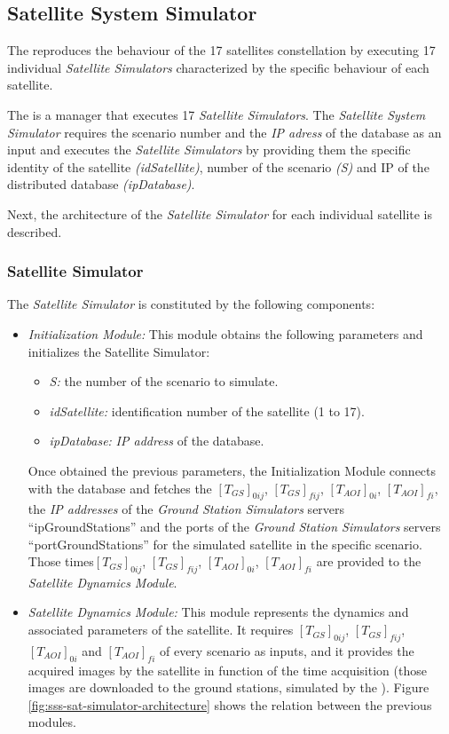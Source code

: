 \subsection{Satellite System Simulator}

The \satss reproduces the behaviour of the 17 satellites constellation by executing 17 individual \emph{Satellite Simulators} characterized by the specific behaviour of each satellite. 

The \satss is a manager that executes 17 \emph{Satellite Simulators}. The
\emph{Satellite System Simulator} requires the scenario number and the \emph{IP adress} of the database as an input and executes the \emph{Satellite Simulators} by providing them the specific identity of the satellite \emph{(idSatellite)}, number of the scenario \emph{(S)} and IP of the distributed database  \emph{(ipDatabase)}.

Next, the architecture of the \emph{Satellite Simulator} for each individual
satellite is described.


\subsubsection{Satellite Simulator}

The \emph{Satellite Simulator} is constituted by the following components:
\begin{itemize}
\item \emph{Initialization Module:} This module obtains the following parameters
  and initializes the Satellite Simulator:
\begin{itemize}
\item \emph{S:} the number of the scenario to simulate.
\item \emph{idSatellite:} identification number of the satellite (1 to 17).
\item \emph{ipDatabase:} \emph{IP address} of the database.
\end{itemize}
Once obtained the previous parameters, the Initialization Module connects with the database and fetches the $[T_{GS}]_{0ij}$, $[T_{GS}]_{fij}$,  $[T_{AOI}]_{0i}$, $[T_{AOI}]_{fi}$, the \emph{IP addresses} of the \emph{Ground Station Simulators} servers “ipGroundStations” and  the ports of the \emph{Ground Station Simulators} servers “portGroundStations” for the simulated satellite in the specific scenario. Those times$[T_{GS}]_{0ij}$, $[T_{GS}]_{fij}$, $[T_{AOI}]_{0i}$, $[T_{AOI}]_{fi}$ are provided to the \emph{Satellite Dynamics Module}.

\item \emph{Satellite Dynamics Module:} This module represents the dynamics and
  associated parameters of the satellite. It requires $[T_{GS}]_{0ij}$, $[T_{GS}]_{fij}$,  $[T_{AOI}]_{0i}$ and $[T_{AOI}]_{fi}$ of every scenario as inputs, and it provides the acquired images by the satellite in function of the time acquisition (those images are downloaded to the ground stations, simulated by the \gsss).
Figure \ref{fig:sss-sat-simulator-architecture} shows the relation between the previous modules.
\end{itemize}

